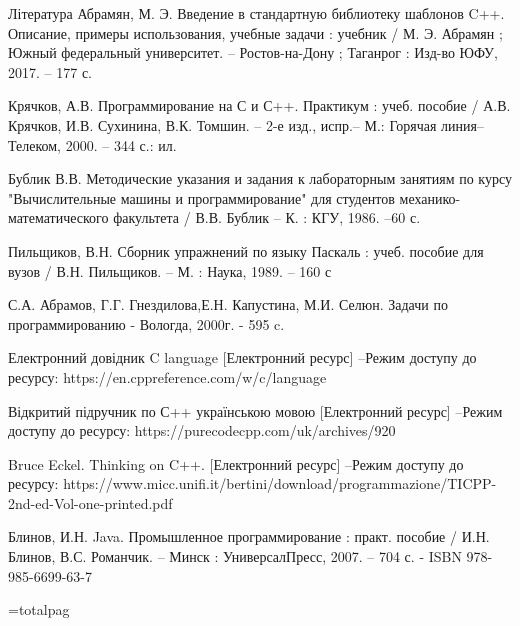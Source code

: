 \documentclass[a5paper,titlepage,openany,twoside,
]
{book_unv}%
\begin{document}
\begin{thebibliography} {Література}
Абрамян, М. Э. Введение в стандартную библиотеку шаблонов C++. Описание, примеры использования, учебные задачи : учебник / М. Э. Абрамян ; Южный федеральный университет. – Ростов-на-Дону ; Таганрог : Изд-во ЮФУ, 2017. – 177 с.

Крячков, А.В. Программирование на С и С++. Практикум : учеб. пособие / А.В. Крячков, И.В. Сухинина, В.К. Томшин. – 2-е изд., испр.– М.: Горячая линия–Телеком, 2000. – 344 с.: ил.

Бублик В.В. Методические указания и задания к лабораторным занятиям по курсу "Вычислительные машины и программирование" для студентов механико-математического факультета / В.В. Бублик – К. : КГУ, 1986. –60 с.

Пильщиков, В.Н. Сборник упражнений по языку Паскаль : учеб. пособие для вузов / В.Н. Пильщиков. – М. : Наука, 1989. – 160 с

С.А. Абрамов, Г.Г. Гнездилова,Е.Н. Капустина, М.И. Селюн. Задачи по программированию - Вологда, 2000г. - 595 c.

Електронний довідник C language [Електронний ресурс] –Режим доступу до ресурсу: https://en.cppreference.com/w/c/language

Відкритий підручник по С++ українською мовою [Електронний ресурс] –Режим доступу до ресурсу: https://purecodecpp.com/uk/archives/920

Bruce Eckel. Thinking on C++. [Електронний ресурс] –Режим доступу до ресурсу: https://www.micc.unifi.it/bertini/download/programmazione/TICPP-2nd-ed-Vol-one-printed.pdf

Блинов, И.Н. Java. Промышленное программирование : практ. пособие / И.Н. Блинов,
В.С. Романчик. – Минск : УниверсалПресс, 2007. – 704 с. - ISBN 978-985-6699-63-7

\end{thebibliography}

=totalpag
\end{document}
